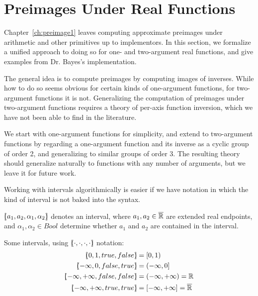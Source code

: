 \section{Preimages Under Real Functions}
\label{sec:preimages-under-real-functions}

\newcommand{\cl}[1]{\overline{\vphantom{i}{#1}}}
\newcommand{\sub}[1]{_{_{#1}}}

Chapter~\ref{ch:preimage1} leaves computing approximate preimages under arithmetic and other primitives up to implementors.
In this section, we formalize a unified approach to doing so for one- and two-argument real functions, and give examples from Dr. Bayes's implementation.

The general idea is to compute preimages by computing images of inverses.
While how to do so seems obvious for certain kinds of one-argument functions, for two-argument functions it is not.
Generalizing the computation of preimages under two-argument functions requires a theory of per-axis function inversion, which we have not been able to find in the literature.

We start with one-argument functions for simplicity, and extend to two-argument functions by regarding a one-argument function and its inverse as a cyclic group of order 2, and generalizing to similar groups of order 3.
The resulting theory should generalize naturally to functions with any number of arguments, but we leave it for future work.

Working with intervals algorithmically is easier if we have notation in which the kind of interval is not baked into the syntax.

\begin{definition}[interval]
$[\mspace{-4.5mu}(a_1,a_2,\alpha_1,\alpha_2)\mspace{-4.5mu}]$ denotes an interval, where $a_1,a_2 \in \cl{\Re}$ are extended real endpoints, and $\alpha_1,\alpha_2 \in Bool$ determine whether $a_1$ and $a_2$ are contained in the interval.
\end{definition}

Some intervals, using $[\mspace{-4.5mu}(\cdot,\cdot,\cdot,\cdot)\mspace{-4.5mu}]$ notation:
\begin{equation}
\begin{aligned}
	\ivl{0,1,true,false} &= [0,1) \\
	\ivl{-\infty,0,false,true} &= (-\infty,0] \\
	\ivl{-\infty,+\infty,false,false} &= (-\infty,+\infty) = \Re \\
	\ivl{-\infty,+\infty,true,true} &= [-\infty,+\infty] = \cl{\Re}
\end{aligned}
\end{equation}


